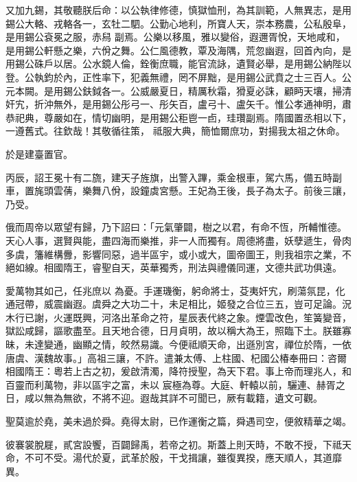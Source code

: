 \begin{pinyinscope}
 又加九錫，其敬聽朕后命：以公執律修德，慎獄恤刑，為其訓範，人無異志，是用錫公大輅、戎輅各一，玄牡二駟。公勤心地利，所寶人天，崇本務農，公私殷阜，是用錫公袞冕之服，赤舄
 副焉。公樂以移風，雅以變俗，遐邇胥悅，天地咸和，是用錫公軒懸之樂，六佾之舞。公仁風德教，覃及海隅，荒忽幽遐，回首內向，是用錫公硃戶以居。公水鏡人倫，銓衡庶職，能官流詠，遺賢必舉，是用錫公納陛以登。公執鈞於內，正性率下，犯義無禮，罔不屏黜，是用錫公武賁之士三百人。公元本闕。是用錫公鈇鉞各一。公威嚴夏日，精厲秋霜，猾夏必誅，顧眄天壤，掃清奸宄，折沖無外，是用錫公彤弓一、彤矢百，盧弓十、盧矢千。惟公孝通神明，肅恭祀典，尊嚴如在，情切幽明，是用錫公秬鬯一卣，珪瓚副焉。隋國置丞相以下，一遵舊式。往欽哉！其敬循往策，
 祗服大典，簡恤爾庶功，對揚我太祖之休命。



 於是建臺置官。



 丙辰，詔王冕十有二旒，建天子旌旗，出警入蹕，乘金根車，駕六馬，備五時副車，置旄頭雲蒨，樂舞八佾，設鐘虡宮懸。王妃為王後，長子為太子。前後三讓，乃受。



 俄而周帝以眾望有歸，乃下詔曰：「元氣肇闢，樹之以君，有命不恆，所輔惟德。天心人事，選賢與能，盡四海而樂推，非一人而獨有。周德將盡，妖孽遞生，骨肉多虞，籓維構釁，影響同惡，過半區宇，或小或大，圖帝圖王，則我祖宗之業，不絕如線。相國隋王，睿聖自天，英華獨秀，刑法與禮儀同運，文德共武功俱遠。



 愛萬物其如己，任兆庶以
 為憂。手運璣衡，躬命將士，芟夷奸宄，刷蕩氛昆，化通冠帶，威震幽遐。虞舜之大功二十，未足相比，姬發之合位三五，豈可足論。況木行已謝，火運既興，河洛出革命之符，星辰表代終之象。煙雲改色，笙簧變音，獄訟咸歸，謳歌盡至。且天地合德，日月貞明，故以稱大為王，照臨下土。朕雖寡昧，未達變通，幽顯之情，皎然易識。今便祗順天命，出遜別宮，禪位於隋，一依唐虞、漢魏故事。」高祖三讓，不許。遣兼太傅、上柱國、杞國公椿奉冊曰：咨爾相國隋王：粵若上古之初，爰啟清濁，降符授聖，為天下君。事上帝而理兆人，和百靈而利萬物，非以區宇之富，未以
 宸極為尊。大庭、軒轅以前，驪連、赫胥之日，咸以無為無欲，不將不迎。遐哉其詳不可聞已，厥有載籍，遺文可觀。



 聖莫逾於堯，美未過於舜。堯得太尉，已作運衡之篇，舜遇司空，便敘精華之竭。



 彼褰裳脫屣，貳宮設饗，百闢歸禹，若帝之初。斯蓋上則天時，不敢不授，下祗天命，不可不受。湯代於夏，武革於殷，干戈揖讓，雖復異揆，應天順人，其道靡異。




\end{pinyinscope}
